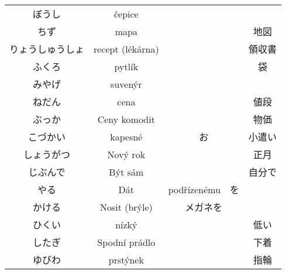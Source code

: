 \begin{table}[H]
\begin{tabular}{cccc}
ぼうし      & čepice                    &&                                   \\
ちず       & mapa                      && 地図                                \\
りょうしゅうしょ & recept (lékárna) &         & 領収書                              \\
ふくろ      & pytlík                    && 袋                                 \\
みやげ      & suvenýr                   &&                                   \\
ねだん      & cena                      && 値段                                \\
ぶっか      & Ceny komodit              && 物価                                \\
こづかい     & kapesné                   & お                          & 小遣い   \\
しょうがつ    & Nový rok                 & & 正月                                \\
じぶんで     & Být sám                   && 自分で                               \\
やる       & Dát                       & podřízenému　を       &              \\
かける      & Nosit (brýle)           &   メガネを                &              \\
ひくい      & nízký                    & & 低い                                \\
したぎ      & Spodní prádlo            & & 下着                                \\
ゆびわ      & prstýnek                  && 指輪                                \\
\hline
\end{tabular}
\end{table}